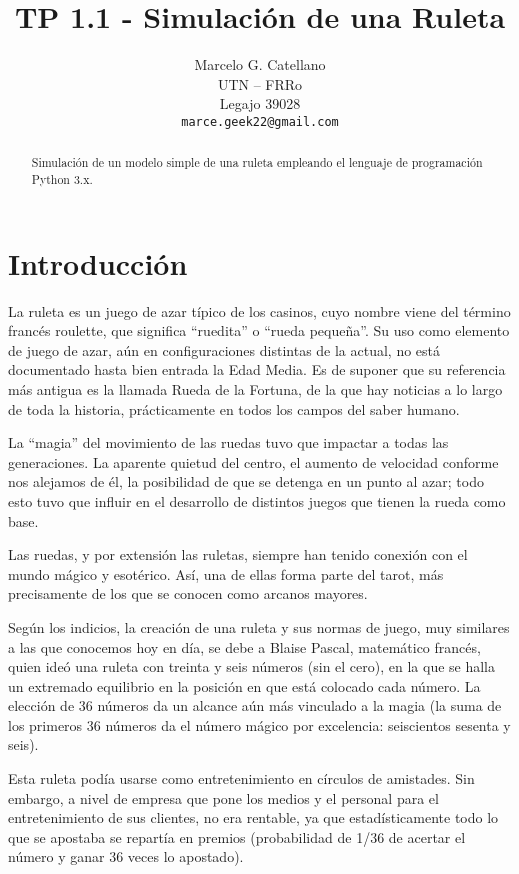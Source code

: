 \documentclass{article}
\title{TP 1.1 - Simulación de una Ruleta}
\author{
 Marcelo G. Catellano \\
  UTN -- FRRo \\
  Legajo 39028 \\
  \texttt{marce.geek22@gmail.com} \\
}
\begin{document}
\maketitle
\begin{abstract}
Simulación de un modelo simple de una ruleta empleando el lenguaje de programación Python 3.x.
\end{abstract}


\section[Introducción]{Introducción \cite{wiki-ruleta}}
La ruleta es un juego de azar típico de los casinos, cuyo nombre viene del término francés roulette, que significa ``ruedita'' o ``rueda pequeña''. Su uso como elemento de juego de azar, aún en configuraciones distintas de la actual, no está documentado hasta bien entrada la Edad Media. Es de suponer que su referencia más antigua es la llamada Rueda de la Fortuna, de la que hay noticias a lo largo de toda la historia, prácticamente en todos los campos del saber humano.

La ``magia'' del movimiento de las ruedas tuvo que impactar a todas las generaciones. La aparente quietud del centro, el aumento de velocidad conforme nos alejamos de él, la posibilidad de que se detenga en un punto al azar; todo esto tuvo que influir en el desarrollo de distintos juegos que tienen la rueda como base.

Las ruedas, y por extensión las ruletas, siempre han tenido conexión con el mundo mágico y esotérico. Así, una de ellas forma parte del tarot, más precisamente de los que se conocen como arcanos mayores.

Según los indicios, la creación de una ruleta y sus normas de juego, muy similares a las que conocemos hoy en día, se debe a Blaise Pascal, matemático francés, quien ideó una ruleta con treinta y seis números (sin el cero), en la que se halla un extremado equilibrio en la posición en que está colocado cada número. La elección de 36 números da un alcance aún más vinculado a la magia (la suma de los primeros 36 números da el número mágico por excelencia: seiscientos sesenta y seis).

Esta ruleta podía usarse como entretenimiento en círculos de amistades. Sin embargo, a nivel de empresa que pone los medios y el personal para el entretenimiento de sus clientes, no era rentable, ya que estadísticamente todo lo que se apostaba se repartía en premios (probabilidad de 1/36 de acertar el número y ganar 36 veces lo apostado).
\end{document}
